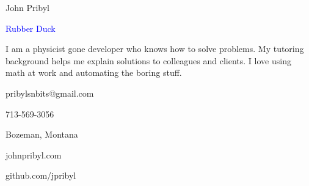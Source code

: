 \documentclass[12pt]{resume}
\begin{document}
    \noindent\begin{minipage}[t]{0.63\textwidth}
        {\par \huge John Pribyl}
        {\par \large \textcolor{blue}{Rubber Duck}}
        \vspace{4pt}
        {\par I am a physicist gone developer who knows how to solve problems.
        My tutoring background helps me explain solutions to colleagues and
        clients. I love using math at work and automating the boring stuff.}
    \end{minipage}
    \begin{minipage}[t]{0.35\textwidth}
        \begin{flushright}
            {\par  pribylsnbits@gmail.com }
            {\par 713-569-3056}
            {\par Bozeman, Montana}
            {\par johnpribyl.com}
            {\par github.com/jpribyl}
        \end{flushright}
    \end{minipage}
    \begin{minipage}[t]{0.03\textwidth}
        \begin{center}
            {\par \faEnvelope} 
            {\par \faMobile} 
            {\par \faMapMarker} 
            {\par \faGlobe} 
            {\par \faGithub} 
        \end{center}
    \end{minipage}
    \\
    \\
    \makebox[\linewidth]{\rule{\paperwidth}{0.2pt}}
\end{document}
